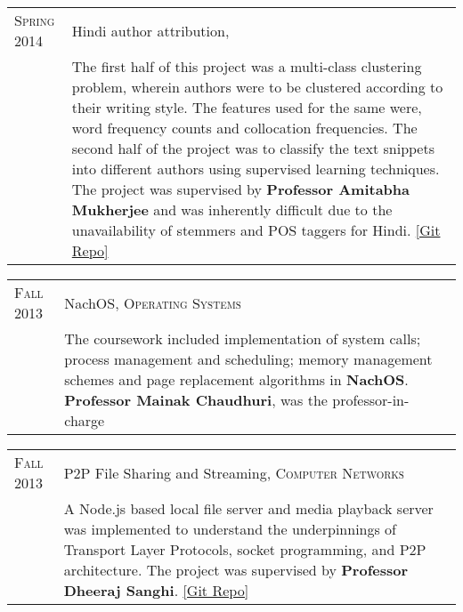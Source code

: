 \documentclass[a4paper,10pt]{article} %
\begin{document}
\begin{tabular}{>{\raggedleft}p{2.2cm}|p{14cm}}
    \textsc{Spring 2014} & Hindi author attribution, \textsc{\raggedright Artificial Intelligence} \\
                         & \footnotesize{The first half of this project was a multi-class clustering problem,
                            wherein authors were to be clustered according to their writing style.
                            The features used for the same were, word frequency counts and collocation
                            frequencies.  The second half of the project was to classify the text snippets
                            into different authors using supervised learning techniques.
                            The project was supervised by \textbf{Professor Amitabha Mukherjee} and was
                            inherently difficult due to the unavailability of stemmers and POS taggers for Hindi.
                            \href{https://github.com/srijanshetty/author-attribution} {[Git Repo]}}\\
\end{tabular}

\begin{tabular}{>{\raggedleft}p{2.2cm}|p{14cm}}
    \textsc{Fall 2013} & NachOS, \textsc{Operating Systems} \\
                       & \footnotesize{The coursework included implementation of system calls; process
                          management and scheduling; memory management schemes and page replacement
                          algorithms in \textbf{NachOS}. \textbf{Professor Mainak Chaudhuri}, was
                          the professor-in-charge}\\
\end{tabular}

\begin{tabular}{>{\raggedleft}p{2.2cm}|p{14cm}}
    \textsc{Fall 2013} & P2P File Sharing and Streaming, \textsc{Computer Networks} \\
                       & \footnotesize{A Node.js based local file server and media playback server was implemented
                          to understand the underpinnings of Transport Layer Protocols, socket programming,
                          and P2P architecture.  The project was supervised by \textbf{Professor Dheeraj Sanghi}.
                          \href{https://github.com/srijanshetty/nodesock} {[Git Repo]}}\\
\end{tabular}
\end{document}
